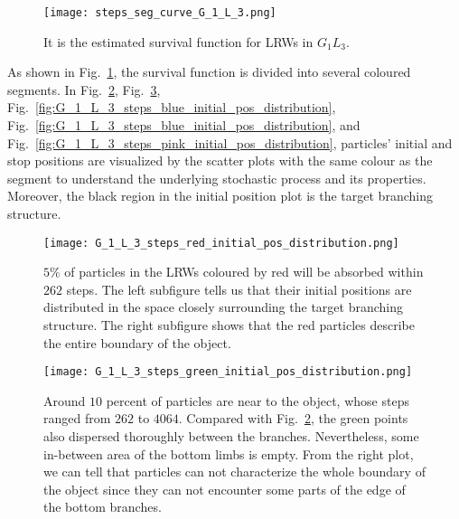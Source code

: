        \begin{figure}
         \centering
         \texttt{[image: steps\_seg\_curve\_G\_1\_L\_3.png]}
         \caption{It is the estimated survival function for LRWs in $G_1L_3$.}
         \label{fig:steps_seg_curve_G_1_L_3}
       \end{figure}

       
       As shown in Fig.~\ref{fig:steps_seg_curve_G_1_L_3}, the
       survival function is divided into several coloured segments. In
       Fig.~\ref{fig:G_1_L_3_steps_red_initial_pos_distribution},
       Fig.~\ref{fig:G_1_L_3_steps_green_initial_pos_distribution},
       Fig.~\ref{fig:G_1_L_3_steps_blue_initial_pos_distribution},
       Fig.~\ref{fig:G_1_L_3_steps_blue_initial_pos_distribution}, and
       Fig.~\ref{fig:G_1_L_3_steps_pink_initial_pos_distribution},
       particles' initial and stop positions are visualized by the
       scatter plots with the same colour as the segment to understand
       the underlying stochastic process and its properties. Moreover,
       the black region in the initial position plot is the target
       branching structure. 

       
       
       \begin{figure}
         \centering
         \texttt{[image: G\_1\_L\_3\_steps\_red\_initial\_pos\_distribution.png]}
         \caption{$5\%$ of particles in the LRWs coloured by red will be absorbed within $262$ steps. The left subfigure tells us that their initial positions are distributed in the space closely surrounding the target branching structure. The right subfigure shows that the red particles describe the entire boundary of the object.}
         \label{fig:G_1_L_3_steps_red_initial_pos_distribution}
       \end{figure}



       \begin{figure}
         \centering
         \texttt{[image: G\_1\_L\_3\_steps\_green\_initial\_pos\_distribution.png]}
         \caption{Around $10$ percent of particles are near to the object, whose steps ranged from $262$ to $4064$. Compared with Fig.~\ref{fig:G_1_L_3_steps_red_initial_pos_distribution}, the green points also dispersed thoroughly between the branches. Nevertheless, some in-between area of the bottom limbs is empty. From the right plot, we can tell that particles can not characterize the whole boundary of the object since they can not encounter some parts of the edge of the bottom branches.}
         \label{fig:G_1_L_3_steps_green_initial_pos_distribution}
       \end{figure}


